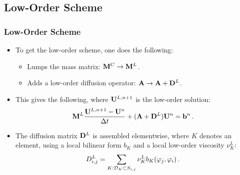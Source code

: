 \documentclass{beamer} \useoutertheme{infolines}
\begin{document}
\subsection{Low-Order Scheme}
\begin{frame}
\frametitle{Low-Order Scheme}

\begin{itemize}
   \item To get the low-order scheme, one does the following:
   \begin{itemize}
      \item Lumps the mass matrix:
        $\mathbf{M}^C\rightarrow\mathbf{M}^L$.
      \item Adds a low-order diffusion operator:
        $\ssmatrix \rightarrow \ssmatrix+\loworderdiffusionmatrix$.
   \end{itemize}
   \item This gives the following, where $\mathbf{U}^{L,n+1}$ is the
     low-order solution:
   \begin{equation}
      \lumpedmassmatrix\frac{\solutionvector^{L,n+1}-\solutionvector^n}{\dt}
        + (\ssmatrix + \diffusionmatrix^L)\solutionvector^n = \ssrhs^n \eqp
   \end{equation}
   \item The diffusion matrix $\diffusionmatrix^L$ is assembled elementwise,
      where $K$ denotes an element, using a local bilinear form $b_K$ and a
      local low-order viscosity $\nu_K^L$:
   \begin{equation}
      D_{i,j}^L = \sum\limits_{K:\mathcal{D}_K\subset S_{i,j}} \nu_K^L b_K(\varphi_j,\varphi_i) \,.
   \end{equation}
\end{itemize}

\end{frame}
\end{document}
